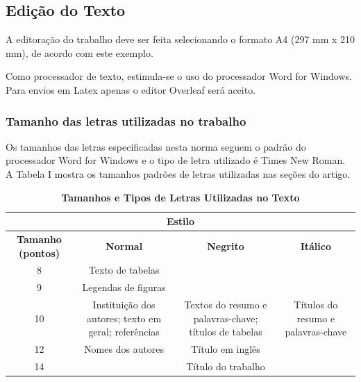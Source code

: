 \documentclass[portugues]{sobraep}
\begin{document}
\subsection{Edição do Texto}

A editoração do trabalho deve ser feita selecionando o formato A4 (297 mm x 210 mm), de acordo com este exemplo.

Como processador de texto, estimula-se o uso do processador Word for Windows. Para envios em Latex apenas o editor Overleaf será aceito.

\subsubsection{Tamanho das letras utilizadas no trabalho}

Os tamanhos das letras especificadas nesta norma seguem o padrão do processador Word for Windows e o tipo de letra utilizado é Times New Roman. A Tabela I mostra os tamanhos padrões de letras utilizadas nas seções do artigo.

\begin{table}[H]
	\centering
	\caption{\textbf{Tamanhos e Tipos de Letras Utilizadas no Texto}}
	\footnotesize
	\setlength{\tabcolsep}{5pt}
	\begin{tabular}{cccc}
		\toprule [1.3pt]	
		\multicolumn{4}{c}{ \textbf{Estilo} } \\
		\hline
		\multirow{2}{1.1cm}{\centering \textbf{Tamanho (pontos)}} & \multirow{2}{*}{\textbf{Normal}} &
		\multirow{2}{*}{\textbf{Negrito}} & \multirow{2}{*}{\textbf{Itálico}} \\
		&  &  & \\		
		\hline
		8 & Texto de tabelas &  &  \\
		\hline
		\multirow{2}{*}{9} & \multirow{2}{2cm}{\centering Legendas de figuras}  &  &  \\
		& & & \\
		\hline
		\multirow{3}{*}{10} &
		\multirow{3}{2cm}{\centering Instituição dos autores; texto em geral; referências}  &
		\multirow{3}{2cm}{\centering Textos do resumo e palavras-chave; títulos de tabelas} &
		\multirow{3}{2.1cm}{\centering Títulos do resumo e palavras-chave} \\
		& &  &  \\
		& &  &  \\
		\hline
		\multirow{2}{*}{12} & \multirow{2}{2cm}{\centering Nomes dos autores}  & \multirow{2}{*}{Título em inglês} &  \\
		& & & \\
		\hline
		14 &  & Título do trabalho & \vspace*{-0.8mm}\\
		\bottomrule[1.3pt]
	\end{tabular} \label{table:TabelaI}
\end{table}
\end{document}
